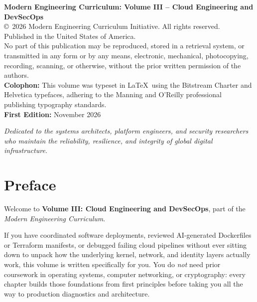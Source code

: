 \documentclass[11pt,oneside]{book}
\begin{document}
\newpage
\thispagestyle{empty}
\vspace*{\fill}
\begin{minipage}{\textwidth}
\sffamily\footnotesize\color{gray!80!black}
\textbf{Modern Engineering Curriculum: Volume III -- Cloud Engineering and DevSecOps}\\
\copyright\ 2026 Modern Engineering Curriculum Initiative. All rights reserved.\\[10pt]
Published in the United States of America.\\[10pt]
No part of this publication may be reproduced, stored in a retrieval system, or transmitted in any form or by any means, electronic, mechanical, photocopying, recording, scanning, or otherwise, without the prior written permission of the authors.\\[10pt]
\textbf{Colophon:} This volume was typeset in \LaTeX\ using the Bitstream Charter and Helvetica typefaces, adhering to the Manning and O'Reilly professional publishing typography standards.\\[10pt]
\textbf{First Edition:} November 2026
\end{minipage}

\newpage
\thispagestyle{empty}
\vspace*{3.5cm}
\begin{center}
  \itshape\Large
  Dedicated to the systems architects, platform engineers, and security researchers\\
  who maintain the reliability, resilience, and integrity of global digital infrastructure.
\end{center}

\newpage
\tableofcontents

\newpage
\chapter*{Preface}

Welcome to \textbf{Volume III: Cloud Engineering and DevSecOps}, part of the \emph{Modern Engineering Curriculum}.

If you have coordinated software deployments, reviewed AI-generated Dockerfiles or Terraform manifests, or debugged failing cloud pipelines without ever sitting down to unpack how the underlying kernel, network, and identity layers actually work, this volume is written specifically for you. You do \emph{not} need prior coursework in operating systems, computer networking, or cryptography: every chapter builds those foundations from first principles before taking you all the way to production diagnostics and architecture.
\end{document}
